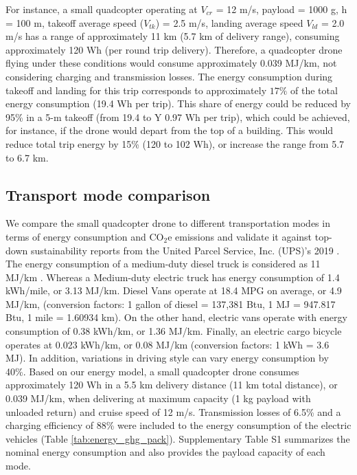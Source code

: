 \documentclass{article}
\begin{document}
For instance, a small quadcopter operating at $V_{cr}$ = 12 m/s, payload = 1000 g, h = 100 m, takeoff average speed ($V_{tk}$) = 2.5 m/s, landing average speed $V_{ld}$ = 2.0 m/s has a range of approximately 11 km (5.7 km of delivery range), consuming approximately 120 Wh (per round trip delivery). 
Therefore, a quadcopter drone flying under these conditions would consume approximately 0.039 MJ/km, not considering charging and transmission losses. The energy consumption during takeoff and landing for this trip corresponds to approximately $17\%$ of the total energy consumption (19.4 Wh per trip). This share of energy could be reduced by 95\% in a 5-m takeoff (from 19.4 to Y 0.97 Wh per trip), which could be achieved, for instance, if the drone would depart from the top of a building. This would reduce total trip energy by 15\% (120 to 102 Wh), or increase the range from 5.7 to 6.7 km.  

\subsection{Transport mode comparison}
We compare the small quadcopter drone to different transportation modes in terms of energy consumption and CO$_{2}$e emissions and validate it against top-down sustainability reports from the United Parcel Service, Inc. (UPS)'s 2019 . The energy consumption of a medium-duty diesel truck is considered as 11 MJ/km \cite{Prohaska2016FieldTrucks}. Whereas a Medium-duty electric truck has energy consumption of 1.4 kWh/mile\cite{Prohaska2016FieldTrucks}, or 3.13 MJ/km. Diesel Vans operate at 18.4 MPG on average\cite{AdvantageOutfitters2019BestMore}, or 4.9 MJ/km, (conversion factors: 1 gallon of diesel = 137,381 Btu\cite{U.S.EnergyInformationAdministrationEIA2020EnergyExplained}, 1 MJ = 947.817 Btu, 1 mile = 1.60934 km). On the other hand, electric vans operate with energy consumption of 0.38 kWh/km\cite{Fiori2018ModellingDataset}, or 1.36 MJ/km. Finally, an electric cargo bicycle operates at 0.023 kWh/km\cite{Erlandsson2017TheVan}, or 0.08 MJ/km (conversion factors: 1 kWh = 3.6 MJ). In addition, variations in driving style can vary energy consumption by 40\%\cite{FuelEconomyManyMPG}. 
Based on our energy model, a small quadcopter drone consumes approximately 120 Wh in a 5.5 km delivery distance (11 km total distance), or 0.039 MJ/km, when delivering at maximum capacity (1 kg payload with unloaded return) and cruise speed of 12 m/s. Transmission losses of 6.5\% and a charging efficiency of 88\% \cite{ArgonneGREETPublication2016Cradle-to-GraveTechnologies,Shiau2009ImpactVehicles, USEPA2019EmissionseGRID, U.S.EnergyInformationAdministrationEIA2021HowStates} were included to the energy consumption of the electric vehicles (Table \ref{tab:energy_ghg_pack}). Supplementary Table S1 summarizes the nominal energy consumption and also provides the payload capacity of each mode. 
\end{document}
